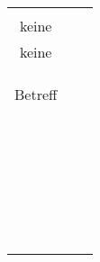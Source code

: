 \begin{landscape}
\begin{tabular}{ccc}
{		&
		\\
		keine\\
		keine\\
		\\
		&%
		\\
		\\
		Betreff\\
		\\
		&%
		\\
		\\
		\\
		\\
		&
		\\
		\\
		\\
		\\
		&
		\\
		\\
		\\
		\\
		&
		\\
		\\
		\\
		\\
		&%
		\\
		\\
		\\
		\\
		&
		\\
		\\
		\\
		\\
		&
		\\ \hline
		
}
\end{tabular}
\end{landscape}
